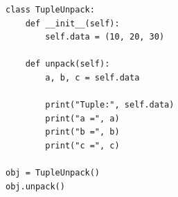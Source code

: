 \begin{verbatim}
class TupleUnpack:
    def __init__(self):
        self.data = (10, 20, 30)

    def unpack(self):
        a, b, c = self.data

        print("Tuple:", self.data)
        print("a =", a)
        print("b =", b)
        print("c =", c)

obj = TupleUnpack()
obj.unpack()
\end{verbatim}